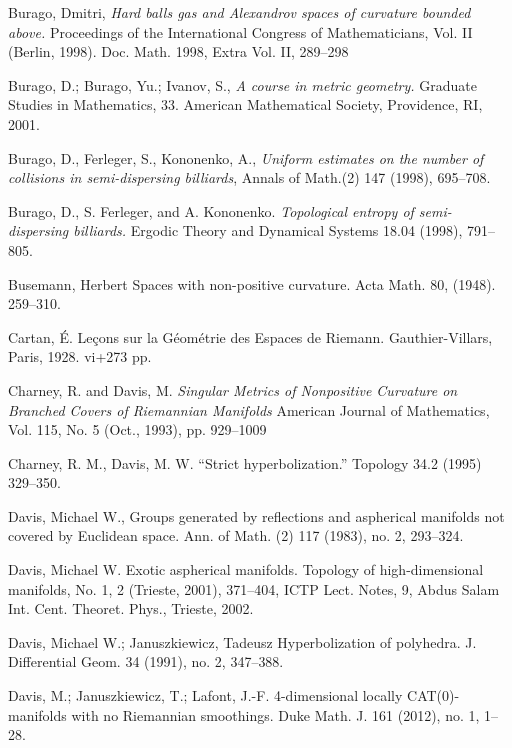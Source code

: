 \begin{thebibliography}{52}
 Burago, Dmitri, \textit{Hard balls gas and Alexandrov spaces of curvature bounded above.} Proceedings of the International Congress of Mathematicians, Vol. II (Berlin, 1998). Doc. Math. 1998, Extra Vol. II, 289–298

 Burago, D.; Burago, Yu.; Ivanov, S., \textit{A course in metric geometry.} Graduate Studies in Mathematics, 33. American Mathematical Society, Providence, RI, 2001. 

Burago, D., Ferleger, S., Kononenko, A.,
\textit{Uniform estimates on the number of collisions in semi-dispersing billiards},
Annals of Math.(2) 147 (1998), 695--708.

Burago, D., S. Ferleger, and A. Kononenko. 
\textit{Topological entropy of semi-dispersing billiards.} 
Ergodic Theory and Dynamical Systems 18.04 (1998), 791--805.

Busemann, Herbert 
Spaces with non-positive curvature. Acta Math. 80, (1948). 259--310.

Cartan, \'E.
Le\c{c}ons sur la G\'eom\'etrie des Espaces de Riemann. 
Gauthier-Villars, Paris, 1928. vi+273 pp.

Charney, R. and  Davis, M.
\textit{Singular Metrics of Nonpositive Curvature on Branched Covers of Riemannian Manifolds}
American Journal of Mathematics, Vol. 115, No. 5 (Oct., 1993), pp. 929--1009

Charney, R. M., Davis, M. W. 
``Strict hyperbolization.'' Topology 34.2 (1995) 329--350.

Davis, Michael W., Groups generated by reflections and aspherical manifolds not covered by Euclidean space.
Ann. of Math. (2) 117 (1983), no. 2, 293--324. 

 Davis, Michael W. Exotic aspherical manifolds. Topology of high-dimensional manifolds, No. 1, 2 (Trieste, 2001), 371--404, ICTP Lect. Notes, 9, Abdus Salam Int. Cent. Theoret. Phys., Trieste, 2002.



 Davis, Michael W.; Januszkiewicz, Tadeusz Hyperbolization of polyhedra. J. Differential Geom. 34 (1991), no. 2, 347--388.

Davis, M.; 
Januszkiewicz, T.; 
Lafont, J.-F.
4-dimensional locally CAT(0)-manifolds with no Riemannian smoothings. 
Duke Math. J. 161 (2012), no. 1, 1--28.


\end{thebibliography}
